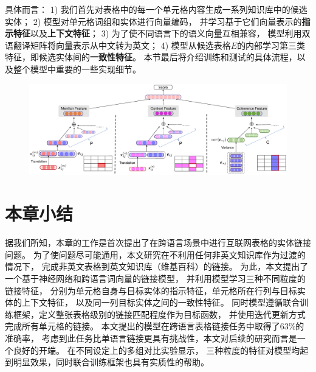 具体而言：
1) 我们首先对表格中的每一个单元格内容生成一系列知识库中的候选实体；%
2) 模型对单元格词组和实体进行向量编码，
并学习基于它们向量表示的\textbf{指示特征}以及\textbf{上下文特征}；%
3) 为了使不同语言下的语义向量互相兼容，
模型利用双语翻译矩阵将向量表示从中文转为英文；%
4) 模型从候选表格$E$的内部学习第三类特征，即候选实体间的\textbf{一致性特征}。%
本节最后将介绍训练和测试的具体流程，以及整个模型中重要的一些实现细节。%

\begin{figure}
	\centering
    \includegraphics[width=\columnwidth]{figure/tabel/overview.eps}
	\label{fig:tabel-overview}
\end{figure}









\section{本章小结}

据我们所知，本章的工作是首次提出了在跨语言场景中进行互联网表格的实体链接问题。
为了使问题尽可能通用，本文研究在不利用任何非英文知识库作为过渡的情况下，
完成非英文表格到英文知识库（维基百科）的链接。
为此，本文提出了一个基于神经网络和跨语言词向量的链接模型，
并利用模型学习三种不同粒度的链接特征，
分别为单元格自身与目标实体的指示特征，单元格所在行列与目标实体的上下文特征，
以及同一列目标实体之间的一致性特征。
同时模型遵循联合训练框架，定义整张表格级别的链接匹配程度作为目标函数，
并使用迭代更新方式完成所有单元格的链接。
本文提出的模型在跨语言表格链接任务中取得了63\%的准确率，
考虑到此任务比单语言链接更具有挑战性，本文对后续的研究而言是一个良好的开端。
在不同设定上的多组对比实验显示，
三种粒度的特征对模型均起到明显效果，同时联合训练框架也具有实质性的帮助。

